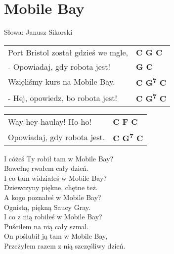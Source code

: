 \section{Mobile Bay}

Słowa: Janusz Sikorski

\vspace{2em}
\begin{tabular}{@{}p{7cm}@{}l@{}}
Port Bristol został gdzieś we mgle, & \bfseries C G C\\
- Opowiadaj, gdy robota jest! & \bfseries G C\\
Wzięliśmy kurs na Mobile Bay. & \bfseries C G\textsuperscript{7} C\\
- Hej, opowiedz, bo robota jest! & \bfseries C G\textsuperscript{7} C\\
\end{tabular}

\vspace{1em}
\begin{tabular}{@{}p{7cm}@{}l@{}}
Way-hey-haulay! Ho-ho! & \bfseries C F C\\
Opowiadaj, gdy robota jest. & \bfseries C G\textsuperscript{7} C\\
\end{tabular}

\vspace{1em}
I cóżeś Ty robił tam w Mobile Bay? \\
Bawełnę rwałem cały dzień. \\

I co tam widziałeś w Mobile Bay? \\
Dziewczyny piękne, chętne też. \\

A kogo poznałeś w Mobile Bay? \\
Ognistą, piękną Saucy Gray. \\

I co z nią robiłeś w Mobile Bay? \\
Puściłem na nią cały szmal. \\

On poślubił ją tam w Mobile Bay, \\
Przeżyłem razem z nią szczęśliwy dzień.